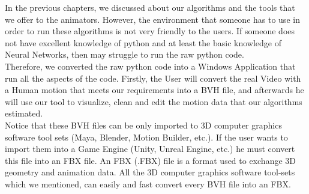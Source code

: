 In the previous chapters, we discussed about our algorithms and the tools that we offer to the animators. However, the environment that someone has to use in order to run these algorithms is not very friendly to the users. If someone does not have excellent knowledge of python and at least the basic knowledge of Neural Networks, then may struggle to run the raw python code.\\

Therefore, we converted the raw python code into a Windows Application that run all the aspects of the code. Firstly, the User will convert the real Video with a Human motion that meets our requirements into a BVH file, and afterwards he will use our tool to visualize, clean and edit the motion data that our algorithms estimated. \\

Notice that these BVH files can be only imported to 3D computer graphics software tool sets (Maya, Blender, Motion Builder, etc.). If the user wants to import them into a Game Engine (Unity, Unreal Engine, etc.) he must convert this file into an FBX file. An FBX (.FBX) file is a format used to exchange 3D geometry and animation data. All the 3D computer graphics software tool-sets which we mentioned, can easily and fast convert every BVH file into an FBX.